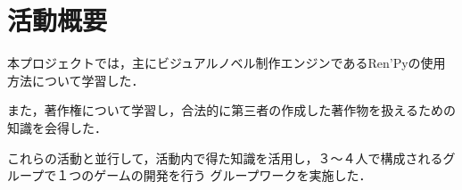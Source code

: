 \section{活動概要}

  本プロジェクトでは，主にビジュアルノベル制作エンジンであるRen'Pyの使用方法について学習した．

  また，著作権について学習し，合法的に第三者の作成した著作物を扱えるための知識を会得した．

  これらの活動と並行して，活動内で得た知識を活用し，３〜４人で構成されるグループで１つのゲームの開発を行う
  グループワークを実施した．
